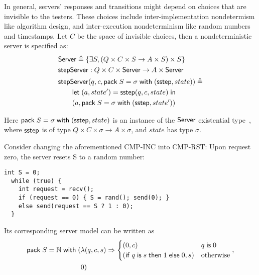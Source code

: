 \begin{definition}
In general, servers' responses and transitions might depend on choices that are
invisible to the testers.  These choices include inter-implementation
nondetermism like algorithm design, and inter-execution nondeterminism like
random numbers and timestamps.  Let $C$ be the space of invisible choices, then
a nondeterministic server is specified as:
\begin{align*}
  &\mathsf{Server}\triangleq\{\exists S,(Q \times C \times S \to A \times S) \times S\} \\
  &\mathsf{stepServer}:Q\times C \times \mathsf{Server} \to A\times \mathsf{Server} \\
  &\mathsf{stepServer}(q,c,\mathsf{pack}\;S=\sigma\;\mathsf{with}\;(\mathsf{sstep}, state))\triangleq\\
  &\qquad\mathsf{let}\;(a,state')=\mathsf{sstep}(q,c,state)\;\mathsf{in}\; \\
  &\qquad(a, \mathsf{pack}\;S=\sigma\;\mathsf{with}\;(\mathsf{sstep}, state'))
\end{align*}

Here $\mathsf{pack}\;S=\sigma\;\mathsf{with}\;(\mathsf{sstep}, state)$ is an instance of the $\mathsf{Server}$
existential type~\cite{tapl}, where $\mathsf{sstep}$ is of type $Q\times
C\times\sigma\to A\times\sigma$, and $state$ has type $\sigma$.
\end{definition}

Consider changing the aforementioned CMP-INC into CMP-RST: Upon request zero,
the server resets \inlinec S to a random number:
\begin{lstlisting}[style=customc]
  int S = 0;
  while (true) {
    int request = recv();
    if (request == 0) { S = rand(); send(0); }
    else send(request == S ? 1 : 0);
  }
\end{lstlisting}
Its corresponding server model can be written as
\begin{align*}
  \mathsf{pack}\;S=\mathbb N\;\mathsf{with}\;(&\lambda(q,c,s)\Rightarrow
      \begin{cases}
        (0,c)& q\;\mathsf{is}\;0\\
        (\mathsf{if}\; q\;\mathsf{is}\; s\;\mathsf{then}\; 1\;\mathsf{else}\; 0,s)&\mathrm{otherwise}
      \end{cases}
   ,\\
    &0)
\end{align*}
